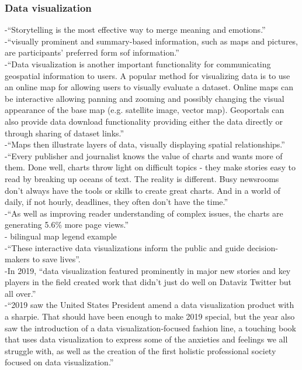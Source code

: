 \subsubsection{Data visualization}
-{\color{orange}“Storytelling is the most effective way to merge meaning and emotions.”\cite{WEF2021}}\\
-{\color{orange}“visually prominent and summary-based information, such as maps and pictures, are participants’ preferred form sof information.” }\cite{Evans-Cowley2010}\\
-{\color{orange}“Data visualization is another important functionality for communicating geospatial information to users. A popular method for visualizing data is to use an online map for allowing users to visually evaluate a dataset. Online maps can be interactive allowing panning and zooming and possibly changing the visual appearance of the base map (e.g. satellite image, vector map). Geoportals can also provide data download functionality providing either the data directly or through sharing of dataset links.”\cite{Jiang2020}}\\
-{\color{orange}“Maps then illustrate layers of data, visually displaying spatial relationships.”\cite{McQueenBaker2019}}\\
-{\color{orange}“Every publisher and journalist knows the value of charts and wants more of them. Done well, charts throw light on difficult topics - they make stories easy to read by breaking up oceans of text. The reality is different. Busy newsrooms don’t always have the tools or skills to create great charts. And in a world of daily, if not hourly, deadlines, they often don’t have the time.”\cite{DNIFund2018}}\\
-{\color{orange}“As well as improving reader understanding of complex issues, the charts are generating 5.6\% more page views.”\cite{DNIFund2018}}\\
-{\color{orange} bilingual map legend example \cite{Witschas2004}}\\
-{\color{orange}“These interactive data visualizations inform the public and guide decision-makers to save lives”.\cite{Shneiderman2020}}\\
-{\color{orange}In 2019, “data visualization featured prominently in major new stories and key players in the field created work that didn’t just do well on Dataviz Twitter but all over.”\cite{Meeks2019}}\\
-{\color{orange}“2019 saw the United States President amend a data visualization product with a sharpie. That should have been enough to make 2019 special, but the year also saw the introduction of a data visualization-focused fashion line, a touching book that uses data visualization to express some of the anxieties and feelings we all struggle with, as well as the creation of the first holistic professional society focused on data visualization.”\cite{Meeks2019}}\\
